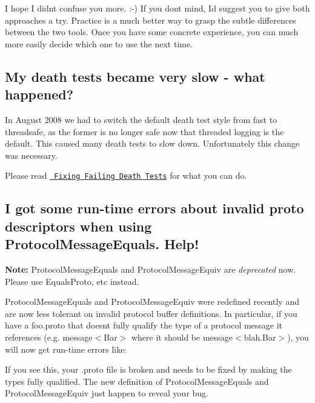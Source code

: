 I hope I didn\textquotesingle{}t confuse you more. \+:-\/) If you don\textquotesingle{}t mind, I\textquotesingle{}d suggest you to give both approaches a try. Practice is a much better way to grasp the subtle differences between the two tools. Once you have some concrete experience, you can much more easily decide which one to use the next time.

\subsection*{My death tests became very slow -\/ what happened?}

In August 2008 we had to switch the default death test style from {\ttfamily fast} to {\ttfamily threadsafe}, as the former is no longer safe now that threaded logging is the default. This caused many death tests to slow down. Unfortunately this change was necessary.

Please read \href{advanced.md\#death-test-styles}{\texttt{ Fixing Failing Death Tests}} for what you can do.

\subsection*{I got some run-\/time errors about invalid proto descriptors when using {\ttfamily Protocol\+Message\+Equals}. Help!}

{\bfseries{Note\+:}} {\ttfamily Protocol\+Message\+Equals} and {\ttfamily Protocol\+Message\+Equiv} are {\itshape deprecated} now. Please use {\ttfamily Equals\+Proto}, etc instead.

{\ttfamily Protocol\+Message\+Equals} and {\ttfamily Protocol\+Message\+Equiv} were redefined recently and are now less tolerant on invalid protocol buffer definitions. In particular, if you have a {\ttfamily foo.\+proto} that doesn\textquotesingle{}t fully qualify the type of a protocol message it references (e.\+g. {\ttfamily message$<$Bar$>$} where it should be {\ttfamily message$<$blah.\+Bar$>$}), you will now get run-\/time errors like\+:


\begin{DoxyCode}{0}
\DoxyCodeLine{... descriptor.cc:...] Invalid proto descriptor for file "path/to/foo.proto":}
\DoxyCodeLine{... descriptor.cc:...]  blah.MyMessage.my\_field: ".Bar" is not defined.}
\end{DoxyCode}


If you see this, your {\ttfamily .proto} file is broken and needs to be fixed by making the types fully qualified. The new definition of {\ttfamily Protocol\+Message\+Equals} and {\ttfamily Protocol\+Message\+Equiv} just happen to reveal your bug.

